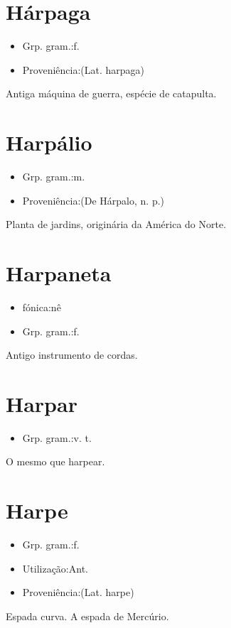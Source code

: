 \documentclass{article}
\begin{document}
\section{Hárpaga}
\begin{itemize}
\item {Grp. gram.:f.}
\end{itemize}
\begin{itemize}
\item {Proveniência:(Lat. \textunderscore harpaga\textunderscore )}
\end{itemize}
Antiga máquina de guerra, espécie de catapulta.
\section{Harpálio}
\begin{itemize}
\item {Grp. gram.:m.}
\end{itemize}
\begin{itemize}
\item {Proveniência:(De \textunderscore Hárpalo\textunderscore , n. p.)}
\end{itemize}
Planta de jardins, originária da América do Norte.
\section{Harpaneta}
\begin{itemize}
\item {fónica:nê}
\end{itemize}
\begin{itemize}
\item {Grp. gram.:f.}
\end{itemize}
Antigo instrumento de cordas.
\section{Harpar}
\begin{itemize}
\item {Grp. gram.:v. t.}
\end{itemize}
O mesmo que \textunderscore harpear\textunderscore .
\section{Harpe}
\begin{itemize}
\item {Grp. gram.:f.}
\end{itemize}
\begin{itemize}
\item {Utilização:Ant.}
\end{itemize}
\begin{itemize}
\item {Proveniência:(Lat. \textunderscore harpe\textunderscore )}
\end{itemize}
Espada curva.
A espada de Mercúrio.
\end{document}
